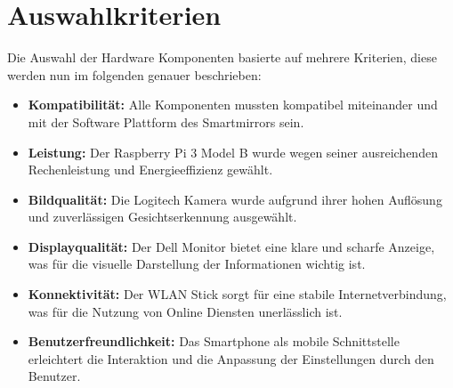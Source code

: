 \section{Auswahlkriterien}
Die Auswahl der Hardware Komponenten basierte auf mehrere Kriterien, diese werden nun im folgenden genauer beschrieben:
\begin{itemize}
    \item \textbf{Kompatibilität:} Alle Komponenten mussten kompatibel miteinander und mit der Software Plattform des Smartmirrors sein.
    \item \textbf{Leistung:} Der Raspberry Pi 3 Model B wurde wegen seiner ausreichenden Rechenleistung und Energieeffizienz gewählt.
    \item \textbf{Bildqualität:} Die Logitech Kamera wurde aufgrund ihrer hohen Auflösung und zuverlässigen Gesichtserkennung ausgewählt.
    \item \textbf{Displayqualität:} Der Dell Monitor bietet eine klare und scharfe Anzeige, was für die visuelle Darstellung der Informationen wichtig ist.
    \item \textbf{Konnektivität:} Der WLAN Stick sorgt für eine stabile Internetverbindung, was für die Nutzung von Online Diensten unerlässlich ist.
    \item \textbf{Benutzerfreundlichkeit:} Das Smartphone als mobile Schnittstelle erleichtert die Interaktion und die Anpassung der Einstellungen durch den Benutzer.
\end{itemize}
